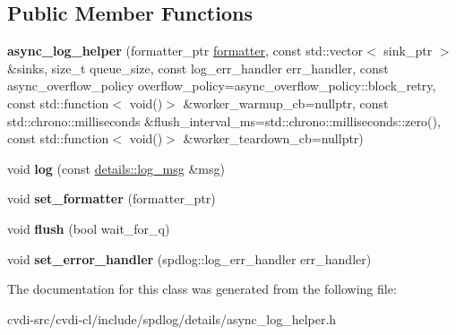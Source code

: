 \subsection*{Public Member Functions}
\begin{DoxyCompactItemize}
\item 
{\bfseries async\+\_\+log\+\_\+helper} (formatter\+\_\+ptr \hyperlink{classspdlog_1_1formatter}{formatter}, const std\+::vector$<$ sink\+\_\+ptr $>$ \&sinks, size\+\_\+t queue\+\_\+size, const log\+\_\+err\+\_\+handler err\+\_\+handler, const async\+\_\+overflow\+\_\+policy overflow\+\_\+policy=async\+\_\+overflow\+\_\+policy\+::block\+\_\+retry, const std\+::function$<$ void()$>$ \&worker\+\_\+warmup\+\_\+cb=nullptr, const std\+::chrono\+::milliseconds \&flush\+\_\+interval\+\_\+ms=std\+::chrono\+::milliseconds\+::zero(), const std\+::function$<$ void()$>$ \&worker\+\_\+teardown\+\_\+cb=nullptr)\hypertarget{classspdlog_1_1details_1_1async__log__helper_a3e6735135a7ce90c88b604fade3f5ed6}{}\label{classspdlog_1_1details_1_1async__log__helper_a3e6735135a7ce90c88b604fade3f5ed6}

\item 
void {\bfseries log} (const \hyperlink{structspdlog_1_1details_1_1log__msg}{details\+::log\+\_\+msg} \&msg)\hypertarget{classspdlog_1_1details_1_1async__log__helper_a1e42d4ca767ff71d3d9df0f2668a87eb}{}\label{classspdlog_1_1details_1_1async__log__helper_a1e42d4ca767ff71d3d9df0f2668a87eb}

\item 
void {\bfseries set\+\_\+formatter} (formatter\+\_\+ptr)\hypertarget{classspdlog_1_1details_1_1async__log__helper_ad8973702ee63c93086e153eeaec7563e}{}\label{classspdlog_1_1details_1_1async__log__helper_ad8973702ee63c93086e153eeaec7563e}

\item 
void {\bfseries flush} (bool wait\+\_\+for\+\_\+q)\hypertarget{classspdlog_1_1details_1_1async__log__helper_a36166b7c51a1b8e7a689ab94fee2b65e}{}\label{classspdlog_1_1details_1_1async__log__helper_a36166b7c51a1b8e7a689ab94fee2b65e}

\item 
void {\bfseries set\+\_\+error\+\_\+handler} (spdlog\+::log\+\_\+err\+\_\+handler err\+\_\+handler)\hypertarget{classspdlog_1_1details_1_1async__log__helper_ae0f9db64915cd9f24db2d2ef32a37229}{}\label{classspdlog_1_1details_1_1async__log__helper_ae0f9db64915cd9f24db2d2ef32a37229}

\end{DoxyCompactItemize}


The documentation for this class was generated from the following file\+:\begin{DoxyCompactItemize}
\item 
cvdi-\/src/cvdi-\/cl/include/spdlog/details/async\+\_\+log\+\_\+helper.\+h\end{DoxyCompactItemize}
